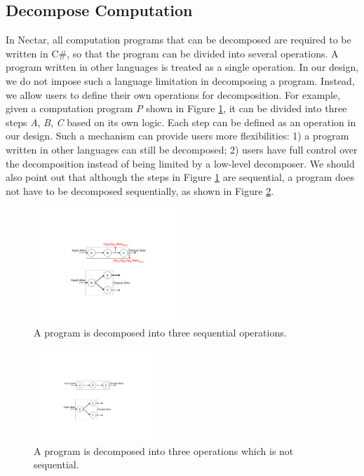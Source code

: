 \documentclass[journal]{IEEEtran}
\begin{document}
\subsection{Decompose Computation}
In Nectar, all computation programs that can be decomposed are required to be
written in C\#, so that the program can be divided into several operations.  A
program written in other languages is treated as a single operation.  In our
design, we do not impose such a language limitation in decomposing a program.
Instead, we allow users to define their own operations for decomposition.  For
example, given a computation program {\it P} shown in Figure \ref{fig:seq-eg},
it can be divided into three steps {\it A}, {\it B}, {\it C} based on its own
logic.  Each step can be defined as an operation in our design.  Such a
mechanism can provide users more flexibilities: 1) a program written in other
languages can still be decomposed; 2) users have full control over the
decomposition instead of being limited by a low-level decomposer.  We should
also point out that although the steps in Figure \ref{fig:seq-eg} are
sequential, a program does not have to be decomposed sequentially, as shown in
Figure \ref{fig:non-seq-eg}.

\begin{figure}
\begin{center}
\includegraphics[width=0.5\textwidth]{fig-p-r/seq-eg.pdf}
\end{center}
\caption{A program is decomposed into three sequential operations.}
\label{fig:seq-eg}
\end{figure}

\begin{figure}
\begin{center}
\includegraphics[width=0.4\textwidth]{fig-p-r/non-seq-eg.pdf}
\end{center}
\caption{A program is decomposed into three operations which is not sequential.}
\label{fig:non-seq-eg}
\end{figure}
\end{document}
